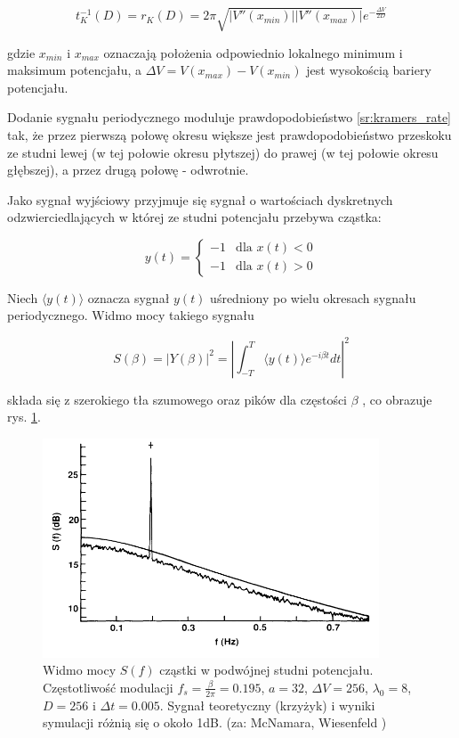   \begin{equation} \label{sr:kramers_rate}
    t^{-1}_K (D) = r_K (D) = 2 \pi \sqrt{|V''(x_{min})| |V''(x_{max})|} e^{-\frac{\Delta V}{2D}}
  \end{equation}

  gdzie $x_{min}$ i $x_{max}$ oznaczają położenia odpowiednio lokalnego minimum i maksimum potencjału, a $\Delta V = V(x_{max}) - V(x_{min})$ jest wysokością bariery potencjału.

  Dodanie sygnału periodycznego moduluje prawdopodobieństwo \ref{sr:kramers_rate} tak, że przez pierwszą połowę okresu większe jest prawdopodobieństwo przeskoku ze studni lewej (w tej połowie okresu płytszej) do prawej (w tej połowie okresu głębszej), a przez drugą połowę - odwrotnie.

  Jako sygnał wyjściowy przyjmuje się sygnał o wartościach dyskretnych odzwierciedlających w której ze studni potencjału przebywa cząstka:

    \begin{equation}
    y(t) = 
    \begin{cases}
      -1 & \text{dla } x(t) < 0 \\
      -1 & \text{dla } x(t) > 0 
    \end{cases}
  \end{equation}

  Niech $\langle y(t) \rangle$ oznacza sygnał $y(t)$ uśredniony po wielu okresach sygnału periodycznego. Widmo mocy takiego sygnału

  \begin{equation} \label{sr:power_spectrum}
    S(\beta) = |Y(\beta)|^2 = |\int_{-T}^T \langle y(t) \rangle e^{-i \beta t} dt |^2
  \end{equation}

  składa się z szerokiego tła szumowego oraz pików dla częstości $\beta$ %
  , co obrazuje rys. \ref{fig:graphics:mcnamara8}.

  \begin{figure}
    \includegraphics[width=100mm]{images/mcnamara_8.png}
    \caption{Widmo mocy $S(f)$ cząstki w podwójnej studni potencjału. Częstotliwość modulacji $f_s = \frac{\beta}{2 \pi} = 0.195$, $a=32$, $\Delta V = 256$, $\lambda_0 = 8$, $D = 256$ i $\Delta t = 0.005$. Sygnał teoretyczny (krzyżyk) i wyniki symulacji różnią się o około 1dB. (za: McNamara, Wiesenfeld \cite{mcnamara})}
    \label{fig:graphics:mcnamara8}
  \end{figure}

